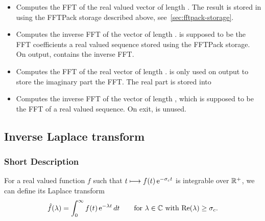 \begin{itemize}
\item {}
  \sshortdescribe Computes the FFT of the real valued vector  of
  length . The result is stored in  using the FFTPack storage
  described above, see~\ref{sec:fftpack-storage}.

\item {}
  \sshortdescribe Computes the inverse FFT of the vector  of length
  .  is supposed to be the FFT coefficients a real valued
  sequence stored using the FFTPack storage. On output,  contains
  the inverse FFT.

\item {}
  \sshortdescribe Computes the FFT of the real vector  of length .
   is only used on output to store the imaginary part the FFT. The
  real part is stored into 
  
\item {}
  \sshortdescribe Computes the inverse FFT of the vector  of
  length , which is supposed to be the FFT of a real valued
  sequence. On exit,  is unused. 
\end{itemize}

\subsection{Inverse Laplace transform}
\subsubsection{Short Description}

For a real valued function $f$ such that $t \longmapsto f(t) \operatorname{e}^{ - \sigma_c
  t }$ is integrable over ${\mathbb R}^+$, we can define its Laplace transform
\begin{equation*}
  \hat{f}(\lambda) = \int_0^\infty f(t) \operatorname{e}^{ - \lambda t } dt \qquad
  \mbox{for $\lambda \in {\mathbb C}$ with $\operatorname{Re}(\lambda) \ge \sigma_c$}.
\end{equation*}

